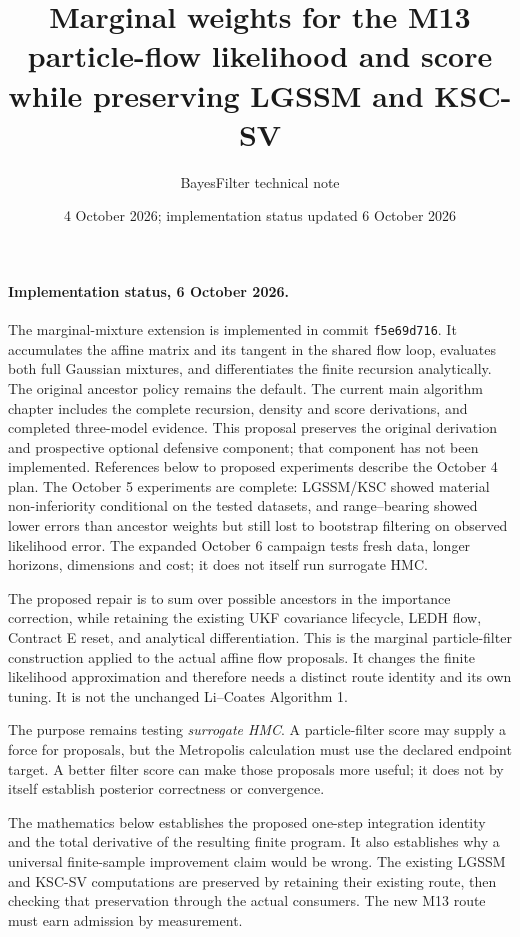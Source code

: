 \documentclass[11pt]{article}
\title{Marginal weights for the M13 particle-flow likelihood and score\\
while preserving LGSSM and KSC-SV}
\author{BayesFilter technical note}
\date{4 October 2026; implementation status updated 6 October 2026}
\begin{document}
\maketitle

\paragraph{Implementation status, 6 October 2026.}
The marginal-mixture extension is implemented in commit \texttt{f5e69d716}.
It accumulates the affine matrix and its tangent in the shared flow loop,
evaluates both full Gaussian mixtures, and differentiates the finite recursion
analytically. The original ancestor policy remains the default. The current
main algorithm chapter includes the complete recursion, density and score
derivations, and completed three-model evidence. This proposal preserves the
original derivation and prospective optional defensive component; that component
has not been implemented. References below to proposed experiments describe
the October 4 plan. The October 5 experiments are complete: LGSSM/KSC showed
material non-inferiority conditional on the tested datasets, and range--bearing
showed lower errors than ancestor weights but still lost to bootstrap filtering
on observed likelihood error. The expanded October 6 campaign tests fresh data,
longer horizons, dimensions and cost; it does not itself run surrogate HMC.


The proposed repair is to sum over possible ancestors in the importance
correction, while retaining the existing UKF covariance lifecycle, LEDH flow,
Contract E reset, and analytical differentiation. This is the marginal
particle-filter construction applied to the actual affine flow proposals.
It changes the finite likelihood approximation and therefore needs a distinct
route identity and its own tuning. It is not the unchanged Li--Coates
Algorithm 1.

The purpose remains testing \emph{surrogate HMC}. A particle-filter score may
supply a force for proposals, but the Metropolis calculation must use the
declared endpoint target. A better filter score can make those proposals more
useful; it does not by itself establish posterior correctness or convergence.

The mathematics below establishes the proposed one-step integration identity
and the total derivative of the resulting finite program. It also establishes
why a universal finite-sample improvement claim would be wrong. The existing
LGSSM and KSC-SV computations are preserved by retaining their existing route,
then checking that preservation through the actual consumers. The new M13
route must earn admission by measurement.
\end{document}
